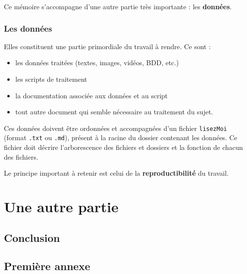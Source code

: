 \documentclass[a4paper,12pt,twoside]{book}
\begin{document}
	Ce mémoire s'accompagne d'une autre partie très importante : les \textbf{données}.
	
	\section{Les données}
	
	Elles constituent une partie primordiale du travail à rendre. Ce sont :
	\begin{itemize}
		\item les données traitées (textes, images, vidéos, BDD, etc.)
		\item les scripts de traitement
		\item la documentation associée aux données et au script
		\item tout autre document qui semble nécessaire au traitement du sujet.
	\end{itemize}
	
	Ces données doivent être ordonnées et accompagnées d'un fichier \texttt{lisezMoi} (format \texttt{.txt} ou \texttt{.md}), présent à la racine du dossier contenant les données. Ce fichier doit décrire l'arborescence des fichiers et dossiers et la fonction de chacun des fichiers.
	
	Le principe important à retenir est celui de la \textbf{reproductibilité} du travail.
	
	\part{Une autre partie}
	
	
	\chapter*{Conclusion}
	
	\appendix
	\chapter{Première annexe}
	
	\backmatter
	
	\tableofcontents
	
\end{document}
